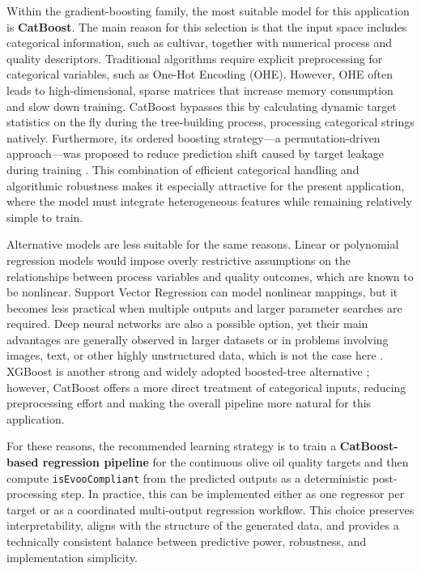 \documentclass[11pt,a4paper]{article}
\begin{document}
Within the gradient-boosting family, the most suitable model for this application is \textbf{CatBoost}. The main reason for this selection is that the input space includes categorical information, such as cultivar, together with numerical process and quality descriptors. Traditional algorithms require explicit preprocessing for categorical variables, such as One-Hot Encoding (OHE). However, OHE often leads to high-dimensional, sparse matrices that increase memory consumption and slow down training. CatBoost bypasses this by calculating dynamic target statistics on the fly during the tree-building process, processing categorical strings natively. Furthermore, its ordered boosting strategy---a permutation-driven approach---was proposed to reduce prediction shift caused by target leakage during training \cite{Prokhorenkova2018}. This combination of efficient categorical handling and algorithmic robustness makes it especially attractive for the present application, where the model must integrate heterogeneous features while remaining relatively simple to train.

Alternative models are less suitable for the same reasons. Linear or polynomial regression models would impose overly restrictive assumptions on the relationships between process variables and quality outcomes, which are known to be nonlinear. Support Vector Regression can model nonlinear mappings, but it becomes less practical when multiple outputs and larger parameter searches are required. Deep neural networks are also a possible option, yet their main advantages are generally observed in larger datasets or in problems involving images, text, or other highly unstructured data, which is not the case here \cite{Grinsztajn2022}. XGBoost is another strong and widely adopted boosted-tree alternative \cite{Chen2016XGBoost}; however, CatBoost offers a more direct treatment of categorical inputs, reducing preprocessing effort and making the overall pipeline more natural for this application.

For these reasons, the recommended learning strategy is to train a \textbf{CatBoost-based regression pipeline} for the continuous olive oil quality targets and then compute \texttt{isEvooCompliant} from the predicted outputs as a deterministic post-processing step. In practice, this can be implemented either as one regressor per target or as a coordinated multi-output regression workflow. This choice preserves interpretability, aligns with the structure of the generated data, and provides a technically consistent balance between predictive power, robustness, and implementation simplicity.
\end{document}
